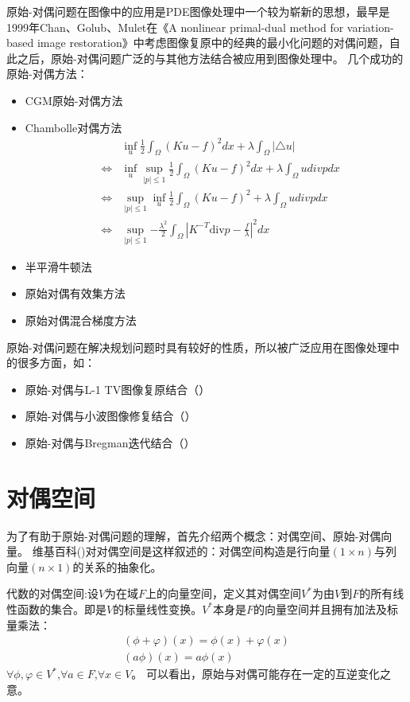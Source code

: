 \documentclass[a4paper,12pt]{article}
\begin{document}
原始-对偶问题在图像中的应用是PDE图像处理中一个较为崭新的思想，最早是1999年Chan、Golub、Mulet在《A nonlinear primal-dual method for variation-based image restoration》中考虑图像复原中的经典的最小化问题的对偶问题，自此之后，原始-对偶问题广泛的与其他方法结合被应用到图像处理中。
几个成功的原始-对偶方法：
\begin{itemize}
\item CGM原始-对偶方法
\item Chambolle对偶方法
\begin{eqnarray}
&&\inf_{u}{\frac{1}{2}\int_{\Omega}(Ku-f)^2dx+\lambda\int_{\Omega}|\bigtriangleup u|}
\\
&\Leftrightarrow&\inf_{u}\sup_{|p|\le 1}{\frac{1}{2}\int_{\Omega}(Ku-f)^2dx+\lambda\int_{\Omega}u divpdx}
\\
&\Leftrightarrow&\sup_{|p|\le 1}\inf_u{\frac{1}{2}\int_\Omega(Ku-f)^2+\lambda \int_\Omega u divp dx}
\\
&\Leftrightarrow&\sup_{|p|\le 1}{-\frac{\lambda^2}{2}\int_\Omega|K^{-T}\textrm{div} p-\frac{f}{\lambda}|^2dx}
\end{eqnarray}

\item 半平滑牛顿法
\item 原始对偶有效集方法
\item 原始对偶混合梯度方法
\end{itemize}


原始-对偶问题在解决规划问题时具有较好的性质，所以被广泛应用在图像处理中的很多方面，如：
\begin{itemize}
\item 原始-对偶与L-1 TV图像复原结合（\cite{DHN}）
\item 原始-对偶与小波图像修复结合（\cite{WCY}）
\item 原始-对偶与Bregman迭代结合（\cite{ZBO}）
\end{itemize}

\section{对偶空间}
为了有助于原始-对偶问题的理解，首先介绍两个概念：对偶空间、原始-对偶向量。
维基百科(\cite{wiki})对对偶空间是这样叙述的：对偶空间构造是行向量$(1×n)$与列向量$(n×1)$的关系的抽象化。

代数的对偶空间:设$V$为在域$F$上的向量空间，定义其对偶空间$V^*$为由$V$到$F$的所有线性函数的集合。即是$V$的标量线性变换。$V^*$本身是$F$的向量空间并且拥有加法及标量乘法：
\begin{equation}
\begin{array}{c}
(\phi+\varphi)(x)=\phi(x)+\varphi(x)
\\
(a\phi)(x)=a\phi(x)
\end{array}
\end{equation}
$\forall \phi , \varphi \in V^*$,$\forall a \in F$,$\forall x \in V$。
可以看出，原始与对偶可能存在一定的互逆变化之意。
\end{document}
